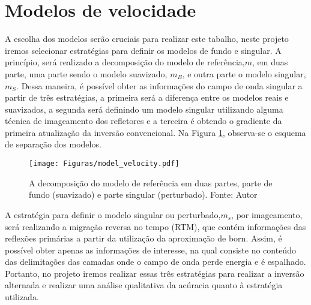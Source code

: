 \section{Modelos de velocidade}
A escolha dos modelos serão cruciais para realizar este tabalho, neste projeto iremos selecionar estratégias para definir os modelos de fundo e singular. A princípio, será realizado a decomposição do modelo de referência,$m$, em duas parte, uma parte sendo o modelo suavizado, $m_{B}$, e outra parte o modelo singular, $m_{S}$. Dessa maneira, é possível obter as informações do campo de onda singular a partir de três estratégias, a primeira será a diferença entre os modelos reais e suavizados, a segunda será definindo um modelo singular utilizando alguma técnica de imageamento dos refletores e a terceira é obtendo o gradiente da primeira atualização da inversão convencional. Na Figura \ref{Fig:escolhamodelo}, observa-se o esquema de separação dos modelos.
\begin{figure}[h!]
  \centering
  \texttt{[image: Figuras/model\_velocity.pdf]}
\caption{A decomposição do modelo de referência em duas partes, parte de fundo (suavizado) e parte singular (perturbado). Fonte: Autor}
\label{Fig:escolhamodelo}
  \end{figure}
  
A estratégia para definir o modelo singular ou perturbado,$m_{s}$, por imageamento, será realizando a migração reversa no tempo (RTM), que contém informações das reflexões primárias a partir da utilização da aproximação de born. Assim, é possível obter apenas as informações de interesse, na qual consiste no conteúdo das delimitações das camadas onde o campo de onda perde energia e é espalhado. Portanto, no projeto iremos realizar essas três estratégias para realizar a inversão alternada e realizar uma análise qualitativa da acúracia quanto à estratégia utilizada.



